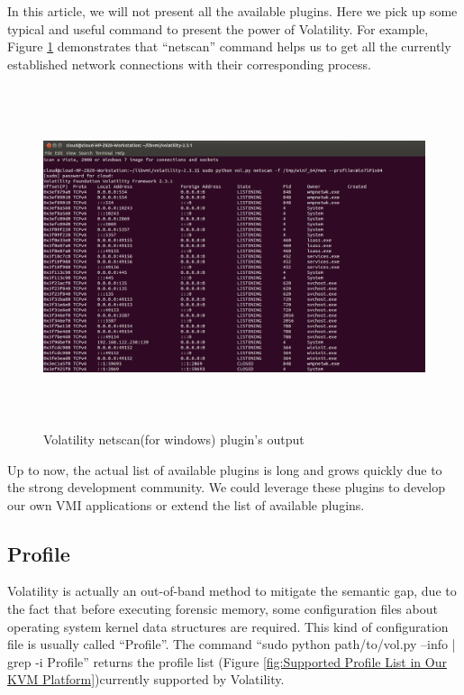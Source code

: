 In this article, we will not present all the available plugins.
Here we pick up some typical and useful command to present the power of Volatility. 
For example, Figure \ref{fig:Volatility netscan(for windows) plugin's output} demonstrates that “netscan” command helps us to get all 
the currently established network connections with their corresponding process.

\begin{figure}[htbp]
	\centering
		\includegraphics[width=14cm, height= 10cm ]{Figures/Figure26.png}
	\caption[Volatility netscan(for windows) plugin's output]{Volatility netscan(for windows) plugin's output}
	\label{fig:Volatility netscan(for windows) plugin's output}
\end{figure}

Up to now, the actual list of available plugins is long and grows quickly due to the strong development community. 
We could leverage these plugins to develop our own VMI applications or extend the list of available plugins.

\subsection{Profile}
Volatility is actually an out-of-band method to mitigate the semantic gap, due to the fact that before executing forensic memory, 
some configuration files about operating system kernel data structures are required. 
This kind of configuration file is usually called “Profile”. 
The command “sudo python path/to/vol.py --info | grep -i Profile” returns the profile list 
(Figure \ref{fig:Supported Profile List in Our KVM Platform})currently supported by Volatility.

